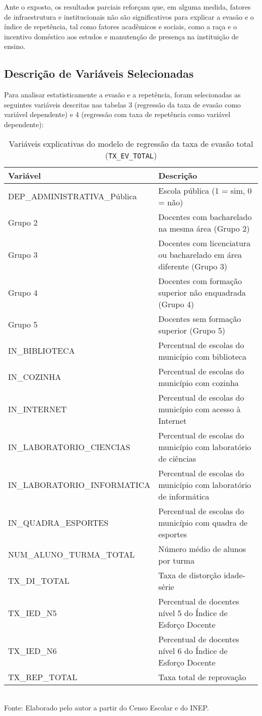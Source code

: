 \documentclass[english, spanish, brazilian]{RBIEarticle} %
\begin{document}
Ante o exposto, os resultados parciais reforçam que, em alguma medida, fatores de infraestrutura e institucionais não são significativos para explicar a evasão e o índice de repetência, tal como fatores acadêmicos e sociais, como a raça e o incentivo doméstico aos estudos e manutenção de presença na instituição de ensino.

\subsection{Descrição de Variáveis Selecionadas}
Para analisar estatisticamente a evasão e a repetência, foram selecionadas as seguintes variáveis descritas nas tabelas 3 (regressão da taxa de evasão como variável dependente) e 4 (regressão com taxa de repetência como variável dependente):

\begin{table}[htbp]
\centering
\caption{Variáveis explicativas do modelo de regressão da taxa de evasão total (\texttt{TX\_EV\_TOTAL})}
\label{tab:variaveis_tx_ev}
\small
\begin{tabular}{lp{9cm}}
\hline
\textbf{Variável} & \textbf{Descrição} \\
\hline
DEP\_ADMINISTRATIVA\_Pública & Escola pública (1 = sim, 0 = não) \\
Grupo 2 & Docentes com bacharelado na mesma área (Grupo 2) \\
Grupo 3 & Docentes com licenciatura ou bacharelado em área diferente (Grupo 3) \\
Grupo 4 & Docentes com formação superior não enquadrada (Grupo 4) \\
Grupo 5 & Docentes sem formação superior (Grupo 5) \\
IN\_BIBLIOTECA & Percentual de escolas do município com biblioteca \\
IN\_COZINHA & Percentual de escolas do município com cozinha \\
IN\_INTERNET & Percentual de escolas do município com acesso à Internet \\
IN\_LABORATORIO\_CIENCIAS & Percentual de escolas do município com laboratório de ciências \\
IN\_LABORATORIO\_INFORMATICA & Percentual de escolas do município com laboratório de informática \\
IN\_QUADRA\_ESPORTES & Percentual de escolas do município com quadra de esportes \\
NUM\_ALUNO\_TURMA\_TOTAL & Número médio de alunos por turma \\
TX\_DI\_TOTAL & Taxa de distorção idade-série \\
TX\_IED\_N5 & Percentual de docentes nível 5 do Índice de Esforço Docente \\
TX\_IED\_N6 & Percentual de docentes nível 6 do Índice de Esforço Docente \\
TX\_REP\_TOTAL & Taxa total de reprovação \\
\hline
\end{tabular}
\\[2mm]
\footnotesize Fonte: Elaborado pelo autor a partir do Censo Escolar e do INEP.
\end{table}
\end{document}
